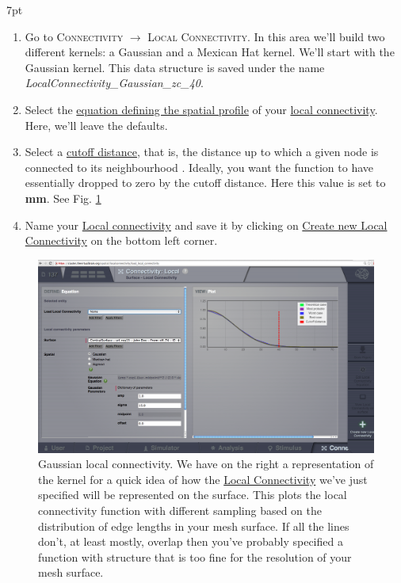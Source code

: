 \documentclass{tufte-handout}
\newenvironment{formal}{%
  \def\FrameCommand{%
    \hspace{1pt}%
    {\color{DarkBlue}\vrule width 2pt}%
    {\color{formalshade}\vrule width 4pt}%
    \colorbox{formalshade}%
  }%
  \MakeFramed{\advance\hsize-\width\FrameRestore}%
  \noindent\hspace{-4.55pt}%
  \begin{adjustwidth}{}{7pt}%
  \vspace{2pt}\vspace{2pt}%
}
{%
  \vspace{2pt}\end{adjustwidth}\endMakeFramed%
}
\begin{document}
\begin{formal}
\begin{enumerate}
\item Go to \textsc{Connectivity} $\rightarrow$ \textsc{Local Connectivity}. 
In this area we'll build two different kernels: a Gaussian and a Mexican Hat kernel. 
We'll start with the Gaussian kernel. This data structure is saved under the name \textit{LocalConnectivity\_Gaussian\_zc\_40}.
\item Select the \underline{equation defining the spatial profile} of your \underline{local connectivity}. Here, we'll leave the defaults.
\item Select a \underline{cutoff distance}, that is, the distance up to which a given node is connected to its neighbourhood \citep{Spiegler_2013}. Ideally, you want the function to have essentially dropped to zero by the cutoff distance. Here this value is set to \textbf{\unit[40]{mm}}. See Fig. \ref{fig:lc_gaussian}
\item Name your \underline{Local connectivity} and save it by clicking on \underline{Create new Local Connectivity} on the bottom left corner. 
\end{enumerate}
\end{formal}

\begin{figure}[h]
  \includegraphics[width=\linewidth]{Handout_UI_BuildingYourOwnBrainNetworkModel_YourOwnLocalConnectivity}%
  \caption{Gaussian local connectivity. We have on the right a representation of the kernel for a quick idea of how
the \underline{Local Connectivity} we've just specified will be represented on the
surface. This plots the local connectivity function with different sampling
based on the distribution of edge lengths in your mesh surface. If all the
lines don't, at least mostly, overlap then you've probably specified a
function with structure that is too fine for the resolution of your mesh
surface. }%
  \label{fig:lc_gaussian}%
\end{figure}
\end{document}
